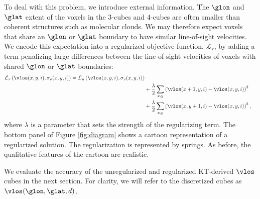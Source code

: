 To deal with this problem, we introduce external information.
The $\glon$ and $\glat$ extent of the voxels in the 3-cubes and 4-cubes are often smaller than coherent structures such as molecular clouds. 
We may therefore expect voxels that share an $\glon$ or $\glat$ boundary to have similar line-of-sight velocities.
We encode this expectation into a regularized objective function, $\mathcal{L}_r$, by adding a term penalizing large differences between the line-of-sight velocities of voxels with shared $\glon$ or $\glat$ boundaries:
\begin{equation}
  \label{eqn:obj_reg}
  \begin{split}
  \mathcal{L}_r\left(\vlos(x, y, i), \sigma_v(x, y, i) \right) = 
  \mathcal{L}_u \left(\vlos(x, y, i), \sigma_v(x, y, i) \right) \\
  &+ \frac{\lambda}{2} \sum_{x, y} \left( \vlos(x + 1, y, i) - \vlos(x, y, i) \right)^2 \\
  &+ \frac{\lambda}{2} \sum_{x, y} \left( \vlos(x, y + 1, i) - \vlos(x, y, i) \right)^2,
  \end{split}
\end{equation}
where $\lambda$ is a parameter that sets the strength of the regularizing term. 
The bottom panel of Figure \ref{fig:diagram} shows a cartoon representation of a regularized solution. 
The regularization is represented by springs. 
As before, the qualitative features of the cartoon are realistic. 

We evaluate the accuracy of the unregularized and regularized KT-derived $\vlos$ cubes in the next section. 
For clarity, we will refer to the discretized cubes as $\vlos(\glon, \glat, d)$. 
